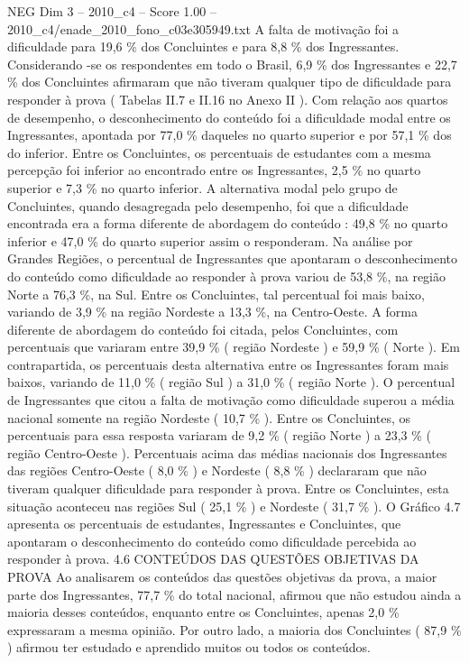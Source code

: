 \begin{textsample}{NEG Dim 3 – 2010\_c4 – Score 1.00 – 2010\_c4/enade\_2010\_fono\_c03e305949.txt}
A falta de motivação foi a dificuldade para 19,6 \% dos Concluintes e para 8,8 \% dos Ingressantes.
Considerando -se os respondentes em todo o Brasil, 6,9 \% dos Ingressantes e 22,7 \% dos Concluintes afirmaram que não tiveram qualquer tipo de dificuldade para responder à prova ( Tabelas II.7 e II.16 no Anexo II ).
Com relação aos quartos de desempenho, o desconhecimento do conteúdo foi a dificuldade modal entre os Ingressantes, apontada por 77,0 \% daqueles no quarto superior e por 57,1 \% dos do inferior.
Entre os Concluintes, os percentuais de estudantes com a mesma percepção foi inferior ao encontrado entre os Ingressantes, 2,5 \% no quarto superior e 7,3 \% no quarto inferior.
A alternativa modal pelo grupo de Concluintes, quando desagregada pelo desempenho, foi que a dificuldade encontrada era a forma diferente de abordagem do conteúdo : 49,8 \% no quarto inferior e 47,0 \% do quarto superior assim o responderam.
Na análise por Grandes Regiões, o percentual de Ingressantes que apontaram o desconhecimento do conteúdo como dificuldade ao responder à prova variou de 53,8 \%, na região Norte a 76,3 \%, na Sul.
Entre os Concluintes, tal percentual foi mais baixo, variando de 3,9 \% na região Nordeste a 13,3 \%, na Centro-Oeste.
A forma diferente de abordagem do conteúdo foi citada, pelos Concluintes, com percentuais que variaram entre 39,9 \% ( região Nordeste ) e 59,9 \% ( Norte ).
Em contrapartida, os percentuais desta alternativa entre os Ingressantes foram mais baixos, variando de 11,0 \% ( região Sul ) a 31,0 \% ( região Norte ).
O percentual de Ingressantes que citou a falta de motivação como dificuldade superou a média nacional somente na região Nordeste ( 10,7 \% ).
Entre os Concluintes, os percentuais para essa resposta variaram de 9,2 \% ( região Norte ) a 23,3 \% ( região Centro-Oeste ).
Percentuais acima das médias nacionais dos Ingressantes das regiões Centro-Oeste ( 8,0 \% ) e Nordeste ( 8,8 \% ) declararam que não tiveram qualquer dificuldade para responder à prova.
Entre os Concluintes, esta situação aconteceu nas regiões Sul ( 25,1 \% ) e Nordeste ( 31,7 \% ).
O Gráfico 4.7 apresenta os percentuais de estudantes, Ingressantes e Concluintes, que apontaram o desconhecimento do conteúdo como dificuldade percebida ao responder à prova. 4.6 CONTEÚDOS DAS QUESTÕES OBJETIVAS DA PROVA Ao analisarem os conteúdos das questões objetivas da prova, a maior parte dos Ingressantes, 77,7 \% do total nacional, afirmou que não estudou ainda a maioria desses conteúdos, enquanto entre os Concluintes, apenas 2,0 \% expressaram a mesma opinião.
Por outro lado, a maioria dos Concluintes ( 87,9 \% ) afirmou ter estudado e aprendido muitos ou todos os conteúdos.

\end{textsample}
